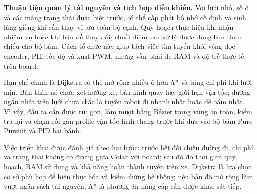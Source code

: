 \noindent\textbf{Thuận tiện quản lý tài nguyên và tích hợp điều khiển.} Với lưới nhỏ, số ô và các mảng trạng thái được biết trước, có thể cấp phát bộ nhớ cố định và sinh láng giềng khi cần thay vì lưu toàn bộ cạnh. Quy hoạch thực hiện khi nhận nhiệm vụ hoặc khi bản đồ thay đổi; chuỗi điểm sau xử lý được dùng làm tham chiếu cho bộ bám. Cách tổ chức này giúp tách việc tìm tuyến khỏi vòng đọc encoder, PID tốc độ và xuất PWM, nhưng vẫn phải đo RAM và độ trễ thực tế trên board.

Hạn chế chính là Dijkstra có thể mở rộng nhiều ô hơn A* và tăng chi phí khi lưới mịn. Bản thân nó chưa xét hướng xe, bán kính quay hay giới hạn vận tốc; đường ngắn nhất trên lưới chưa chắc là tuyến robot đi nhanh nhất hoặc dễ bám nhất. Vì vậy, đầu ra cần được rút gọn, làm mượt bằng Bézier trong vùng an toàn, kiểm tra lại va chạm rồi gán profile vận tốc hình thang trước khi đưa vào bộ bám Pure Pursuit và PID hai bánh.

Việc triển khai được đánh giá theo hai bước: trước hết đối chiếu đường đi, chi phí và trạng thái không có đường giữa Colab với board; sau đó đo thời gian quy hoạch, RAM sử dụng và khả năng hoàn thành tuyến trên xe. Dijkstra là lựa chọn cơ sở phù hợp để hiện thực hóa và kiểm chứng hệ thống; nếu bản đồ mở rộng làm vượt ngân sách tài nguyên, A* là phương án nâng cấp cần được khảo sát tiếp.

